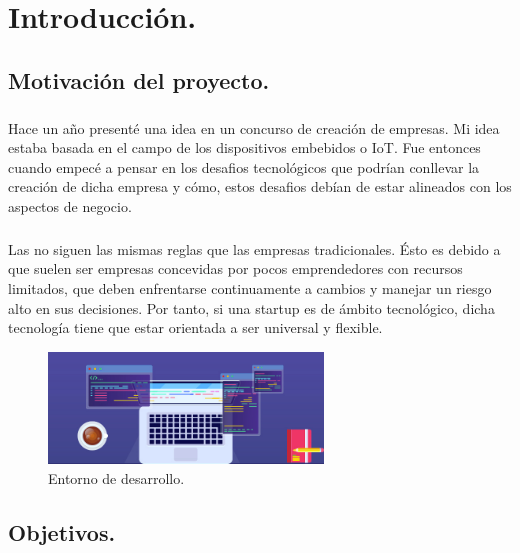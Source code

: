 \chapter{Introducción.}\label{sec:introduccion}



\section{Motivación del proyecto.}

\paragraph{}Hace un año presenté una idea en un concurso de creación de empresas. Mi
idea estaba basada en el campo de los dispositivos embebidos o IoT. Fue
entonces cuando empecé a pensar en los desafios tecnológicos que podrían conllevar la
creación de dicha empresa y cómo, estos desafios debían de estar alineados con los
aspectos de negocio.

\paragraph{}Las  no siguen las mismas reglas que las empresas tradicionales.
Ésto es debido a que suelen ser empresas concevidas por pocos emprendedores con recursos
limitados, que deben enfrentarse continuamente a cambios y manejar un riesgo alto en
sus decisiones. Por tanto, si una \gls{startup} es de ámbito tecnológico, dicha tecnología tiene
que estar orientada a ser universal y flexible.

\hfill \break

\begin{figure}[ht]
    \centering
    \includegraphics[width=0.65\textwidth]{imgs/dev-env.jpg}
    \caption{Entorno de desarrollo.}
    \label{fig:dev-env}
\end{figure}

\hfill \break

\section{Objetivos.}

